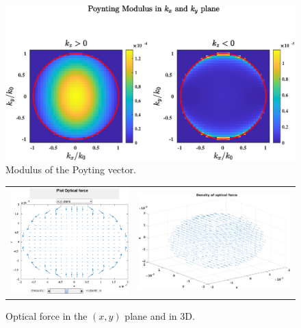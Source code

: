 \begin{figure}[H]
\begin{center}
  \includegraphics*[width=15.0cm,draft=false]{test1poynting2d.eps}
\end{center}
\caption{Modulus of the Poyting vector.}
\end{figure}
\begin{figure}[H]
\begin{center}
\begin{tabular}{cc}
  \includegraphics*[width=7.0cm,draft=false]{test1force2d.eps}
&  \includegraphics*[width=9.0cm,draft=false]{test1force3d.eps}
\end{tabular}

\end{center}
\caption{Optical force in the $(x,y)$ plane and in 3D.}
\end{figure}
